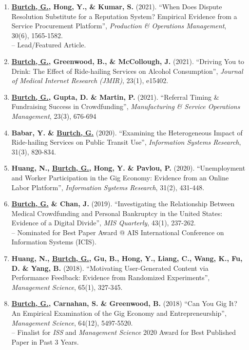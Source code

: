 \documentclass[10.5pt,letterpaper,sans]{moderncv}        %
\begin{document}
\begin{enumerate}[leftmargin=!,labelindent=5pt,itemindent=-15pt]
\item \textbf{\underline{Burtch, G.}, Hong, Y., \& Kumar, S.} (2021). ``When Does Dispute Resolution Substitute for a Reputation System? Empirical Evidence from a Service Procurement Platform'', \textit{Production \& Operations Management}, 30(6), 1565-1582.\\-- Lead/Featured Article.

\item \textbf{\underline{Burtch, G.}, Greenwood, B., \& McCollough, J.} (2021). ``Driving You to Drink: The Effect of Ride-hailing Services on Alcohol Consumption'', \textit{Journal of Medical Internet Research (JMIR)}, 23(1), e15402.

\item \textbf{\underline{Burtch, G.}, Gupta, D. \& Martin, P.} (2021). ``Referral Timing \& Fundraising Success in Crowdfunding'', \textit{Manufacturing \& Service Operations Management}, 23(3), 676-694

\item \textbf{Babar, Y. \& \underline{Burtch, G.}} (2020). ``Examining the Heterogeneous Impact of Ride-hailing Services on Public Transit Use'', \textit{Information Systems Research}, 31(3), 820-834.

\item \textbf{Huang, N., \underline{Burtch, G.}, Hong, Y. \& Pavlou, P.} (2020). ``Unemployment and Worker Participation in the Gig Economy: Evidence from an Online Labor Platform'', \textit{Information Systems Research}, 31(2), 431-448.

\item \textbf{\underline{Burtch, G.} \& Chan, J.} (2019). ``Investigating the Relationship Between Medical Crowdfunding and Personal Bankruptcy in the United States: Evidence of a Digital Divide'', \textit{MIS Quarterly}, 43(1), 237-262. \\-- Nominated for Best Paper Award @ AIS International Conference on Information Systems (ICIS).

\item \textbf{Huang, N., \underline{Burtch, G.}, Gu, B., Hong, Y., Liang, C., Wang, K., Fu, D. \& Yang, B.} (2018). ``Motivating User-Generated Content via Performance Feedback: Evidence from Randomized Experiments'', \textit{Management Science}, 65(1), 327-345.

\item \textbf{\underline{Burtch, G.}, Carnahan, S. \& Greenwood, B.} (2018) ``Can You Gig It? An Empirical Examination of the Gig Economy and Entrepreneurship'', \textit{Management Science}, 64(12), 5497-5520. \\-- Finalist for \textit{ISS} and \textit{Management Science} 2020 Award for Best Published Paper in Past 3 Years.


\end{enumerate}
\end{document}

